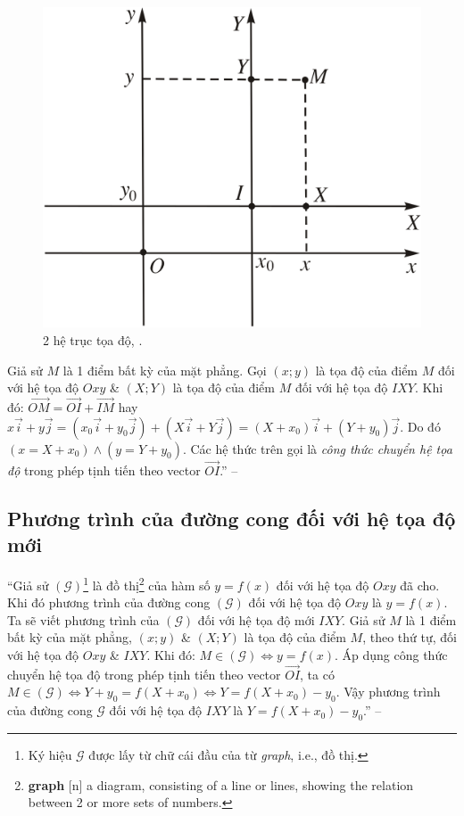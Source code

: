 \documentclass[oneside]{book}
\numberwithin{equation}{section}
\begin{document}
\begin{figure}[H]
	\centering
	\includegraphics[scale=0.15]{2_he_truc_toa_do}
	\caption{2 hệ trục tọa độ, \cite[Hình 1.5, p. 25]{SGK_Toan_12_giai_tich_nang_cao}.}
	\label{fig:2_he_truc_toa_do}
\end{figure}
Giả sử $M$ là 1 điểm bất kỳ của mặt phẳng. Gọi $(x;y)$ là tọa độ của điểm $M$ đối với hệ tọa độ $Oxy$ \& $(X;Y)$ là tọa độ của điểm $M$ đối với hệ tọa độ $IXY$. Khi đó: $\overrightarrow{OM} = \overrightarrow{OI} + \overrightarrow{IM}$ hay $x\vec{i} + y\vec{j} = (x_0\vec{i} + y_0\vec{j}) + (X\vec{i} + Y\vec{j}) = (X + x_0)\vec{i} + (Y + y_0)\vec{j}$. Do đó $(x = X + x_0)\land(y = Y + y_0)$. Các hệ thức trên gọi là \textit{công thức chuyển hệ tọa độ} trong phép tịnh tiến theo vector $\overrightarrow{OI}$.'' -- \cite[p. 25]{SGK_Toan_12_giai_tich_nang_cao}

\subsection{Phương trình của đường cong đối với hệ tọa độ mới}
``Giả sử $(\mathcal{G})$\footnote{Ký hiệu $\mathcal{G}$ được lấy từ chữ cái đầu của từ \textit{graph}, i.e., đồ thị.} là đồ thị\footnote{\textbf{graph} [n] a diagram, consisting of a line or lines, showing the relation between 2 or more sets of numbers.} của hàm số $y = f(x)$ đối với hệ tọa độ $Oxy$ đã cho. Khi đó phương trình của đường cong $(\mathcal{G})$ đối với hệ tọa độ $Oxy$ là $y = f(x)$. Ta sẽ viết phương trình của $(\mathcal{G})$ đối với hệ tọa độ mới $IXY$. Giả sử $M$ là 1 điểm bất kỳ của mặt phẳng, $(x;y)$ \& $(X;Y)$ là tọa độ của điểm $M$, theo thứ tự, đối với hệ tọa độ $Oxy$ \& $IXY$. Khi đó: $M\in(\mathcal{G})\Leftrightarrow y = f(x)$. Áp dụng công thức chuyển hệ tọa độ trong phép tịnh tiến theo vector $\overrightarrow{OI}$, ta có $M\in(\mathcal{G})\Leftrightarrow Y + y_0 = f(X + x_0)\Leftrightarrow Y = f(X + x_0) - y_0$. Vậy phương trình của đường cong $\mathcal{G}$ đối với hệ tọa độ $IXY$ là $Y = f(X + x_0) - y_0$.'' -- \cite[pp. 25--26]{SGK_Toan_12_giai_tich_nang_cao}
\end{document}
